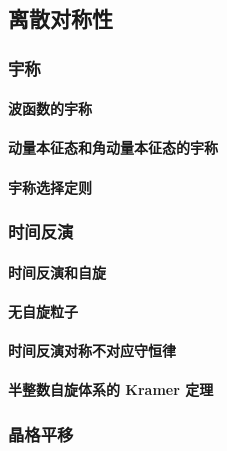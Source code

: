 \documentclass[../../main.tex]{subfiles}
\begin{document}
\subsection{离散对称性}
\subsubsection{宇称}
\paragraph{波函数的宇称}
\paragraph{动量本征态和角动量本征态的宇称}
\paragraph{宇称选择定则}
\subsubsection{时间反演}
\paragraph{时间反演和自旋}
\paragraph{无自旋粒子}
\paragraph{时间反演对称不对应守恒律}
\paragraph{半整数自旋体系的 Kramer 定理}
\subsubsection{晶格平移}
\end{document}
